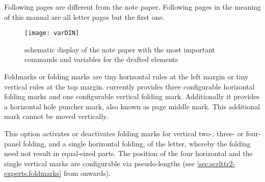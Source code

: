 Following pages are different from
the note paper. Following pages in the meaning of this manual are all letter
pages but the first one.

\begin{figure}
  \centering
  \texttt{[image: varDIN]}
  \caption{schematic display of the note paper with the most important
    commands and variables for the drafted elements}
  \label{fig:scrlttr2.variables}
\end{figure}

\begin{Declaration}
\end{Declaration}
Foldmarks or folding marks are tiny
horizontal rules at the left margin or tiny vertical rules at the top
margin. \KOMAScript{} currently provides three configurable horizontal folding
marks and one configurable vertical folding mark. Additionally it provides a
horizontal hole puncher mark, also known as page middle mark. This additional
mark cannot be moved vertically.

This option activates or deactivates folding marks for vertical
two-, three- or four-panel folding, and a single horizontal folding, of the
letter, whereby the folding need not result in equal-sized parts. The position
of the four horizontal and the single vertical marks are configurable via
pseudo-lengths (see \autoref{sec:scrlttr2-experts.foldmarks} from
 onwards).

